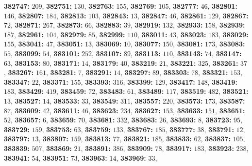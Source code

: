 \textsf{\bfseries 382747:} $209$, \textsf{\bfseries 382751:} $130$, \textsf{\bfseries 382763:} $155$, \textsf{\bfseries 382769:} $105$, \textsf{\bfseries 382777:} $46$, \textsf{\bfseries 382801:} $146$, \textsf{\bfseries 382807:} $184$, \textsf{\bfseries 382813:} $103$, \textsf{\bfseries 382843:} $13$, \textsf{\bfseries 382847:} $46$, \textsf{\bfseries 382861:} $129$, \textsf{\bfseries 382867:} $72$, \textsf{\bfseries 382871:} $267$, \textsf{\bfseries 382873:} $66$, \textsf{\bfseries 382883:} $39$, \textsf{\bfseries 382919:} $132$, \textsf{\bfseries 382933:} $158$, \textsf{\bfseries 382939:} $187$, \textsf{\bfseries 382961:} $104$, \textsf{\bfseries 382979:} $85$, \textsf{\bfseries 382999:} $110$, \textsf{\bfseries 383011:} $43$, \textsf{\bfseries 383023:} $183$, \textsf{\bfseries 383029:} $155$, \textsf{\bfseries 383041:} $47$, \textsf{\bfseries 383051:} $13$, \textsf{\bfseries 383069:} $10$, \textsf{\bfseries 383077:} $150$, \textsf{\bfseries 383081:} $173$, \textsf{\bfseries 383083:} $55$, \textsf{\bfseries 383099:} $54$, \textsf{\bfseries 383101:} $252$, \textsf{\bfseries 383107:} $89$, \textsf{\bfseries 383113:} $110$, \textsf{\bfseries 383143:} $74$, \textsf{\bfseries 383147:} $63$, \textsf{\bfseries 383153:} $80$, \textsf{\bfseries 383171:} $14$, \textsf{\bfseries 383179:} $40$, \textsf{\bfseries 383219:} $21$, \textsf{\bfseries 383221:} $325$, \textsf{\bfseries 383261:} $37$, \textsf{\bfseries 383267:} $161$, \textsf{\bfseries 383281:} $7$, \textsf{\bfseries 383291:} $14$, \textsf{\bfseries 383297:} $89$, \textsf{\bfseries 383303:} $78$, \textsf{\bfseries 383321:} $153$, \textsf{\bfseries 383347:} $22$, \textsf{\bfseries 383371:} $155$, \textsf{\bfseries 383393:} $316$, \textsf{\bfseries 383399:} $129$, \textsf{\bfseries 383417:} $148$, \textsf{\bfseries 383419:} $183$, \textsf{\bfseries 383429:} $419$, \textsf{\bfseries 383459:} $72$, \textsf{\bfseries 383483:} $61$, \textsf{\bfseries 383489:} $117$, \textsf{\bfseries 383519:} $482$, \textsf{\bfseries 383521:} $13$, \textsf{\bfseries 383527:} $14$, \textsf{\bfseries 383533:} $33$, \textsf{\bfseries 383549:} $311$, \textsf{\bfseries 383557:} $220$, \textsf{\bfseries 383573:} $173$, \textsf{\bfseries 383587:} $87$, \textsf{\bfseries 383609:} $42$, \textsf{\bfseries 383611:} $46$, \textsf{\bfseries 383623:} $234$, \textsf{\bfseries 383627:} $153$, \textsf{\bfseries 383633:} $151$, \textsf{\bfseries 383651:} $52$, \textsf{\bfseries 383657:} $6$, \textsf{\bfseries 383659:} $70$, \textsf{\bfseries 383681:} $332$, \textsf{\bfseries 383683:} $26$, \textsf{\bfseries 383693:} $8$, \textsf{\bfseries 383723:} $95$, \textsf{\bfseries 383729:} $159$, \textsf{\bfseries 383753:} $63$, \textsf{\bfseries 383759:} $133$, \textsf{\bfseries 383767:} $185$, \textsf{\bfseries 383777:} $38$, \textsf{\bfseries 383791:} $12$, \textsf{\bfseries 383797:} $13$, \textsf{\bfseries 383807:} $159$, \textsf{\bfseries 383813:} $77$, \textsf{\bfseries 383821:} $185$, \textsf{\bfseries 383833:} $62$, \textsf{\bfseries 383837:} $105$, \textsf{\bfseries 383839:} $507$, \textsf{\bfseries 383869:} $21$, \textsf{\bfseries 383891:} $386$, \textsf{\bfseries 383909:} $78$, \textsf{\bfseries 383917:} $183$, \textsf{\bfseries 383923:} $238$, \textsf{\bfseries 383941:} $54$, \textsf{\bfseries 383951:} $73$, \textsf{\bfseries 383963:} $14$, \textsf{\bfseries 383969:} $33$, 
